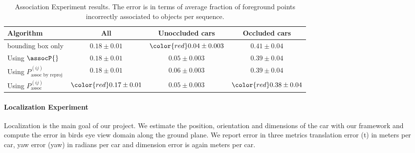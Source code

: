 \begin{table}
  \centering
  \begin{tabular}{lccc}
    \toprule
    Algorithm & All & Unoccluded cars & Occluded cars \\
    \midrule
    bounding box only                         & $0.18\pm0.01$          & $\color{red}0.04\pm0.003$  & $0.41\pm0.04$\\
    Using $\assocP{}$                         & $0.18\pm0.01$          & $0.05\pm0.003$           & $0.39\pm0.04$ \\
    Using $P^{(ij)}_{\text{assoc by reproj}}$ & $0.18\pm0.01$          & $0.06\pm0.003$           & $0.39\pm0.04$\\
    Using $P^{(ij)}_{\text{assoc}}$           & $\color{red}0.17\pm0.01$ & $0.05\pm0.003$           & $\color{red}0.38\pm0.04$\\
    \bottomrule
  \end{tabular}
  \caption{Association Experiment results. The error is in terms of average fraction of foreground points incorrectly associated to objects per sequence. }
\end{table}


\paragraph{Localization Experiment}
Localization is the main goal of our project. We estimate the position, orientation and dimensions of the car with our framework and compute the error in birds eye view domain along the ground plane. We report error in three metrics translation error (t) in meters per car, yaw error (yaw) in radians per car and dimension error is again meters per car.


